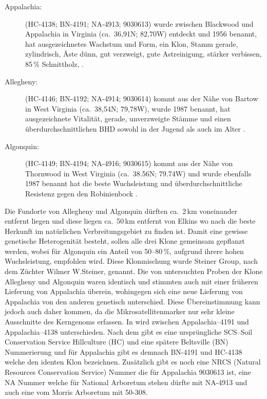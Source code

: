 \documentclass[twocolumn]{scrartcl}
\begin{document}
\begin{description}
  \item[Appalachia:] (HC-4138; BN-4191; NA-4913; 9030613) wurde zwischen
Blackwood und Appalachia in Virginia (ca.~36,91N; 82,70W) entdeckt und 1956
benannt, hat ausgezeichnetes Wachstum und Form, ein Klon, Stamm gerade,
zylindrisch, Äste dünn, gut verzweigt, gute Astreinigung, stärker verbissen,
85\,\% Schnittholz, \citep{steinergroup1987robinie,zsombor1980robinie,kapusi1995robinie}.
  \item[Allegheny:]  (HC-4146; BN-4192; NA-4914; 9030614) kommt aus der Nähe von
Bartow in West Virginia (ca.~38,54N; 79,78W), wurde 1987 benannt, hat
ausgezeichnete Vitalität, gerade, unverzweigte Stämme und einen
überdurchschnittlichen BHD sowohl in der Jugend als auch im Alter \citep{steinergroup1987robinie}.
  \item[Algonquin:] (HC-4149; BN-4194; NA-4916; 9030615) kommt aus der Nähe von
Thornwood in West Virginia (ca.~38.56N; 79.74W) und wurde ebenfalls 1987 benannt
hat die beste Wuchsleistung und überdurchschnittliche Resistenz gegen den
Robinienbock \citep{steinergroup1987robinie}.
\end{description}

Die Fundorte von Allegheny und Algonquin dürften ca.\ 2\,km
voneinander entfernt liegen und diese liegen ca.\ 50\,km entfernt von Elkins wo
nach \citet{hopp1941robinie} die beste Herkunft im natürlichen Verbreitungsgebiet
zu finden ist.  Damit eine gewisse genetische Heterogenität besteht, sollen alle
drei Klone gemeinsam gepflanzt werden, wobei für Algonquin ein Anteil von
50--80\,\%, aufgrund ihrere hohen Wuchsleistung, empfohlen wird. Diese
Klonmischung wurde Steiner Group, nach dem Züchter Wilmer W.Steiner, genannt.
Die von \citet{liesebach2012robinie}
untersuchten Proben der Klone Allegheny und Algonquin waren identisch und
stimmten auch mit einer früheren Lieferung von Appalachia überein, wohingegen
sich eine neue Lieferung von Appalachia von den anderen genetisch unterschied.
Diese Übereinstimmung kann jedoch auch daher kommen, da die
Mikrosatellitenmarker nur sehr kleine Ausschnitte des Kerngenoms erfassen. In
\citet{liesebach2021robinie} wird zwischen Appalachia--4191 und Appalachia--4138
unterschieden. Nach dem \citet{steinergroup1987robinie} gibt es eine
ursprüngliche SCS--Soil Conservation Service Hillculture (HC) und eine spätere
Beltsville (BN) Nummerierung und für Appalachia gibt es demnach BN-4191 und
HC-4138 welche den identen Klon bezeichnen. Zusätzlich gibt es noch eine NRCS
(Natural Resources Conservation Service) Nummer die für Appalachia 9030613 ist,
eine NA Nummer welche für National Arboretum stehen dürfte mit NA-4913 und auch
eine vom Morris Arboretum mit 50-308.
\end{document}
